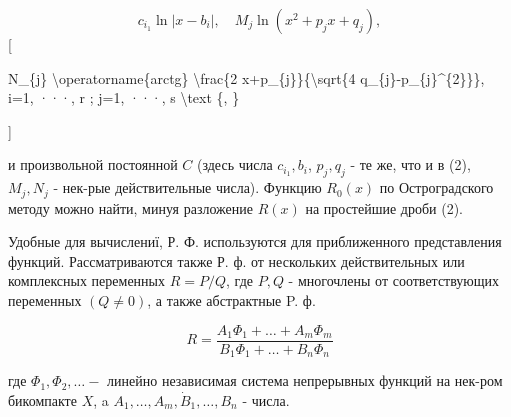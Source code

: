\documentclass[10pt]{article}
\begin{document}
\[

c_{i_{1}} \ln \left|x-b_{i}\right|, \quad M_{j} \ln \left(x^{2}+p_{j} x+q_{j}\right),

\][



N\_\{j\} \textbackslash operatorname\{arctg\} \textbackslash frac\{2 x+p\_\{j\}\}\{\textbackslash sqrt\{4 q\_\{j\}-p\_\{j\}\^{}\{2\}\}\}, i=1, ···, r ; j=1, ···, s \textbackslash text \{, \}

]



и произвольной постоянной $C$ (здесь числа $c_{i_{1}}, b_{i}$, $p_{j}, q_{j}$ - те же, что и в (2), $M_{j}, N_{j}$ - нек-рые действительные числа). Функцию $R_{0}(x)$ по Остроградского методу можно найти, минуя разложение $R(x)$ на простейшие дроби (2).



Удобные для вычислениї, Р. Ф. используются для приближенного представления функций. Рассматриваются также Р. ф. от нескольких действительных или комплексных переменных $R=P / Q$, где $P, Q$ - многочлены от соответствующих переменных $(Q \neq 0)$, а также абстрактные P. ф.



\[

R=\frac{A_{1} \Phi_{1}+\ldots+A_{m} \Phi_{m}}{B_{1} \Phi_{1}+\ldots+B_{n} \Phi_{n}}

\]



где $\Phi_{1}, \Phi_{2}, \ldots-$ линейно независимая система непрерывных функций на нек-ром бикомпакте $X$, a $A_{1}, \ldots, A_{m}, \dot{B}_{1}, \ldots, B_{n}$ - числа.
\end{document}
